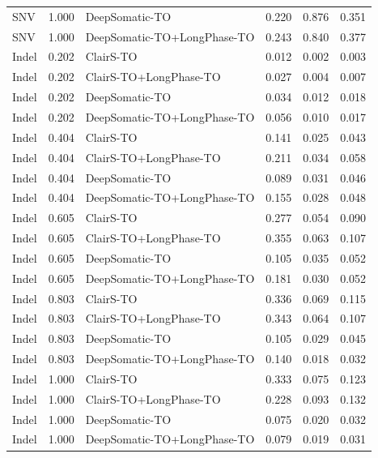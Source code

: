 \documentclass[pdflatex,sn-nature]{sn-jnl}
\begin{document}
\begin{table}[htbp]
\begin{tabular}{@{}lllccc@{}}
    SNV & 1.000 & DeepSomatic-TO & 0.220 & 0.876 & 0.351 \\
    SNV & 1.000 & DeepSomatic-TO+LongPhase-TO & 0.243 & 0.840 & 0.377 \\
    \addlinespace
    Indel & 0.202 & ClairS-TO & 0.012 & 0.002 & 0.003 \\
    Indel & 0.202 & ClairS-TO+LongPhase-TO & 0.027 & 0.004 & 0.007 \\
    Indel & 0.202 & DeepSomatic-TO & 0.034 & 0.012 & 0.018 \\
    Indel & 0.202 & DeepSomatic-TO+LongPhase-TO & 0.056 & 0.010 & 0.017 \\
    \addlinespace
    Indel & 0.404 & ClairS-TO & 0.141 & 0.025 & 0.043 \\
    Indel & 0.404 & ClairS-TO+LongPhase-TO & 0.211 & 0.034 & 0.058 \\
    Indel & 0.404 & DeepSomatic-TO & 0.089 & 0.031 & 0.046 \\
    Indel & 0.404 & DeepSomatic-TO+LongPhase-TO & 0.155 & 0.028 & 0.048 \\
    \addlinespace
    Indel & 0.605 & ClairS-TO & 0.277 & 0.054 & 0.090 \\
    Indel & 0.605 & ClairS-TO+LongPhase-TO & 0.355 & 0.063 & 0.107 \\
    Indel & 0.605 & DeepSomatic-TO & 0.105 & 0.035 & 0.052 \\
    Indel & 0.605 & DeepSomatic-TO+LongPhase-TO & 0.181 & 0.030 & 0.052 \\
    \addlinespace
    Indel & 0.803 & ClairS-TO & 0.336 & 0.069 & 0.115 \\
    Indel & 0.803 & ClairS-TO+LongPhase-TO & 0.343 & 0.064 & 0.107 \\
    Indel & 0.803 & DeepSomatic-TO & 0.105 & 0.029 & 0.045 \\
    Indel & 0.803 & DeepSomatic-TO+LongPhase-TO & 0.140 & 0.018 & 0.032 \\
    \addlinespace
    Indel & 1.000 & ClairS-TO & 0.333 & 0.075 & 0.123 \\
    Indel & 1.000 & ClairS-TO+LongPhase-TO & 0.228 & 0.093 & 0.132 \\
    Indel & 1.000 & DeepSomatic-TO & 0.075 & 0.020 & 0.032 \\
    Indel & 1.000 & DeepSomatic-TO+LongPhase-TO & 0.079 & 0.019 & 0.031 \\
    \bottomrule
  \end{tabular}
\end{table}
\end{document}

